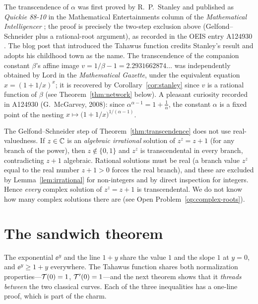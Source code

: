 \begin{remark}
\label{rem:stanley}
The transcendence of $\alpha$ was first proved by R.~P.~Stanley and
published as \emph{Quickie 88-10} in the Mathematical Entertainments
column of the \emph{Mathematical Intelligencer} \cite{stanley89}; the
proof is precisely the two-step exclusion above (Gelfond--Schneider plus
a rational-root argument), as recorded in the OEIS entry
\textrm{A124930} \cite{a124930}. The blog post \cite{blog} that
introduced the Tahawus function credits Stanley's result and adopts his
childhood town as the name. The transcendence of the companion constant
$\beta$'s affine image $v = 1/\beta - 1 = 2.2931662874\ldots$ was
independently obtained by Lord \cite{lord} in the \emph{Mathematical
Gazette}, under the equivalent equation $x = (1+1/x)^{x}$; it is
recovered by Corollary~\ref{cor:stanley} since $v$ is a rational
function of $\beta$ (see Theorem~\ref{thm:network} below). A pleasant
 curiosity recorded in \textrm{A124930} (G.~McGarvey, 2008): since
$\alpha^{\alpha - 1} = 1 + \tfrac1\alpha$, the constant $\alpha$ is a
fixed point of the nesting $x \mapsto \bigl(1 + 1/x\bigr)^{1/(\alpha-1)}$.
\end{remark}

\begin{remark}
\label{rem:complex-roots}
The Gelfond--Schneider step of Theorem~\ref{thm:transcendence} does not
use real-valuedness. If $z \in \mathbb{C}$ is an \emph{algebraic irrational}
solution of $z^{z} = z + 1$ (for any branch of the power), then
$z \notin \{0,1\}$ and $z^{z}$ is transcendental in every branch,
contradicting $z + 1$ algebraic. Rational solutions must be real (a
branch value $z^{z}$ equal to the real number $z+1>0$ forces the real
branch), and these are excluded by Lemma~\ref{lem:irrational} for
non-integers and by direct inspection for integers. Hence \emph{every}
complex solution of $z^{z} = z+1$ is transcendental. We do not know how
many complex solutions there are (see
Open Problem~\ref{op:complex-roots}).
\end{remark}

\section{The sandwich theorem}\label{sec:sandwich}

The exponential $\ee^{y}$ and the line $1+y$ share the value $1$ and the
slope $1$ at $y = 0$, and $\ee^{y} \ge 1 + y$ everywhere. The Tahawus
function shares both normalization properties---$\mathcal{T}(0) = 1$,
$\mathcal{T}'(0) = 1$---and the next theorem shows that it \emph{threads
between} the two classical curves. Each of the three inequalities has a
one-line proof, which is part of the charm.

